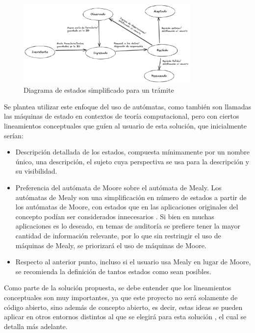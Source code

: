 \begin{figure}[ht]
	\centering
	\includegraphics[width=0.8\textwidth]{assets/stateprocedureexample}
	\caption{Diagrama de estados simplificado para un trámite}
	\label{fig:states_procedure}
\end{figure}

Se plantea utilizar este enfoque del uso de autómatas, como también son llamadas
las máquinas de estado en contextos de teoría computacional, pero con ciertos
lineamientos conceptuales que guíen al usuario de esta solución, que
inicialmente serían:

\begin{itemize}
	\item Descripción detallada de los estados, compuesta mínimamente por un
	      nombre único, una descripción, el sujeto cuya perspectiva se usa para la
	      descripción y su visibilidad.

	\item Preferencia del autómata de Moore sobre el autómata de Mealy. Los
	      autómatas de Mealy son una simplificación en número de estados a partir
	      de los autómatas de Moore, con estados que en las aplicaciones
	      originales del concepto podían ser considerados innecesarios
	      \parencite{mealyMethodSynthesizingSequential1955}.  Si bien en muchas
	      aplicaciones es lo deseado, en temas de auditoría se prefiere tener la
	      mayor cantidad de información relevante, por lo que sin restringir el
	      uso de máquinas de Mealy, se priorizará el uso de máquinas de Moore.

	\item Respecto al anterior punto, incluso si el usuario usa Mealy en lugar
	      de Moore, se recomienda la definición de tantos estados como sean
	      posibles.

\end{itemize}

Como parte de la solución propuesta, se debe entender que los lineamientos
conceptuales son muy importantes, ya que este proyecto no será solamente de
código abierto, sino además de concepto abierto, es decir, estas ideas se pueden
aplicar en otros entornos distintos al que se elegirá para esta solución
\cite[439]{sommervilleSoftwareEngineering2016}, el cual se detalla más adelante.

